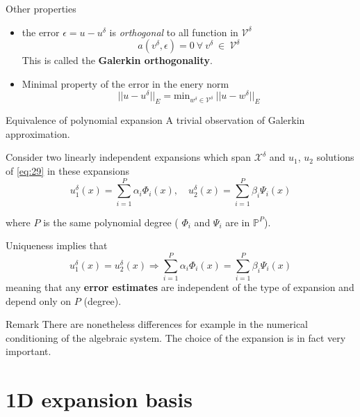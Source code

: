 \begin{frame}{Other properties}
  \begin{itemize}
  \item the error $\epsilon = u-u^\delta$ is \emph{orthogonal} to all function in $\mathcal{V}^\delta$
    \begin{equation}
      \label{eq:33}
      a(v^\delta, \epsilon) = 0\ \forall\ v^\delta\ \in\ \mathcal{V}^\delta
    \end{equation}
    This is called the \textbf{Galerkin orthogonality}.
  \item Minimal property of the error in the enery norm
    \begin{equation}
      \label{eq:34}
      ||u-u^\delta||_E = \mathrm{min}_{w^{\delta} \in \mathcal{V}^\delta}\ ||u-w^\delta||_E
    \end{equation}
  \end{itemize}
\end{frame}

\begin{frame}{Equivalence of polynomial expansion}
  A trivial observation of Galerkin approximation.

  Consider two linearly independent expansions which span
  $\mathcal{X}^\delta$ and $u_1$, $u_2$  solutions of \eqref{eq:29} in these
  expansions
  \begin{equation}
    \label{eq:36}
    u_1^\delta(x) = \sum_{i=1}^P \alpha_i \Phi_i(x), \quad u_2^\delta(x) = \sum_{i=1}^P \beta_i \Psi_i(x)
  \end{equation}

  where $P$ is the same polynomial degree ( $\Phi_i$ and $\Psi_i$ are in $\mathbb{P}^P$).

  Uniqueness implies that
  \begin{equation}
    \label{eq:37}
    u_1^\delta(x) = u_2^\delta(x) \Rightarrow \sum_{i=1}^P \alpha_i \Phi_i(x) = \sum_{i=1}^P \beta_i \Psi_i(x)
  \end{equation}
  meaning that any \textbf{error estimates} are independent of the type of expansion and depend only on $P$ (degree).

  \begin{alertblock}{Remark}
    There are nonetheless differences for example in the numerical
    conditioning of the algebraic system. The choice of the expansion
    is in fact very important.
  \end{alertblock}
\end{frame}

\section{1D expansion basis}
\label{sec:1d-expansion-basis}

